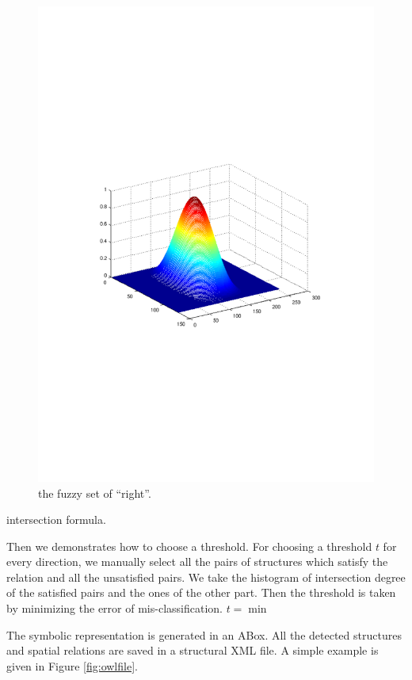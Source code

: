 \documentclass{article}
\begin{document}
\begin{figure}[h]
 \centering
 \includegraphics[width=.5\textwidth]{./figures/right.pdf}
 \caption{\label{fig:right}the fuzzy set of ``right''.}
\end{figure}

intersection formula.


Then we demonstrates how to choose a threshold.
For choosing a threshold $t$ for every direction, we manually select all the pairs of structures which satisfy the relation and all the unsatisfied pairs.
We take the histogram of intersection degree of the satisfied pairs and the ones of the other part.
Then the threshold is taken by minimizing the error of mis-classification.
$t=\min $

The symbolic representation is generated in an ABox. All the detected structures and spatial relations are saved in a structural XML file.
A simple example is given in Figure \ref{fig:owlfile}.

 
\end{document}
